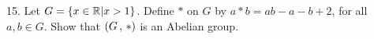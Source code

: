 \newpage
\begin{mdframed}[style=darkQuesion]
15. Let $G=\left\{x\in \mathbb{R}\vert x>1\right\}$. Define $\ast$ on $G$ by $a\ast b = ab-a-b+2$,
for all $a,b\in G$. Show that $\left(G\,,\,\ast\right)$ is an Abelian group.
\end{mdframed}

\begin{mdframed}[style=darkAnswer,frametitle={Joe Starr}]
\begin{itemize}[align=left]


\end{itemize}
\end{mdframed}
